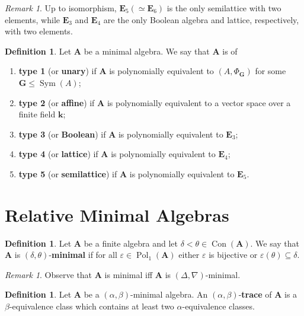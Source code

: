\documentclass{amsart}
\theoremstyle{plain}
\theoremstyle{definition}
\newtheorem{definition}[theorem]{Definition}
\theoremstyle{remark}
\newtheorem{remark}[theorem]{Remark}
\def\epsilon{\varepsilon}
\DeclareMathOperator{\Con}{Con}
\DeclareMathOperator{\Pol}{Pol}
\DeclareMathOperator{\Sym}{Sym}
\DeclareMathOperator{\M}{M}
\begin{document}
\begin{remark}
    Up to isomorphism, $\mathbf{E}_5 (\simeq \mathbf{E}_6)$ is the only semilattice with two elements, while $\mathbf{E}_3$ and $\mathbf{E}_4$ are the only Boolean algebra and lattice, respectively, with two elements. 
\end{remark}

\begin{definition}
    \label{defn_type}
    Let $\mathbf{A}$ be a minimal algebra. 
    We say that $\mathbf{A}$ is of 
    \begin{enumerate}
        \item \textbf{type 1} (or \textbf{unary}) if $\mathbf{A}$ is polynomially equivalent to $(A, \Phi_\mathbf{G})$ for some $\mathbf{G} \le \Sym(A)$; 
        \item \textbf{type 2} (or \textbf{affine}) if $\mathbf{A}$ is polynomially equivalent to a vector space over a finite field $\mathbf{k}$; 
        \item \textbf{type 3} (or \textbf{Boolean}) if $\mathbf{A}$ is polynomially equivalent to $\mathbf{E}_3$;
        \item \textbf{type 4} (or \textbf{lattice}) if $\mathbf{A}$ is polynomially equivalent to $\mathbf{E}_4$;
        \item \textbf{type 5} (or \textbf{semilattice}) if $\mathbf{A}$ is polynomially equivalent to $\mathbf{E}_5$. 
    \end{enumerate}
\end{definition}

\section{Relative Minimal Algebras} 
\begin{definition}
    Let $\mathbf{A}$ be a finite algebra and let $\delta < \theta \in \Con(\mathbf{A})$. 
    We say that $\mathbf{A}$ is $(\delta, \theta)$-\textbf{minimal} if for all $\epsilon \in \Pol_1(\mathbf{A})$ either $\epsilon$ is bijective or $\epsilon(\theta) \subseteq \delta$. 
\end{definition}

\begin{remark}
    Observe that $\mathbf{A}$ is minimal iff $\mathbf{A}$ is $(\Delta, \nabla)$-minimal. 
\end{remark}

\begin{definition}
    Let $\mathbf{A}$ be a $(\alpha, \beta)$-minimal algebra. 
    An $(\alpha, \beta)$-\textbf{trace} of $\mathbf{A}$ is 
    a $\beta$-equivalence class which contains at least two $\alpha$-equivalence classes. 
\end{definition}
\end{document}
